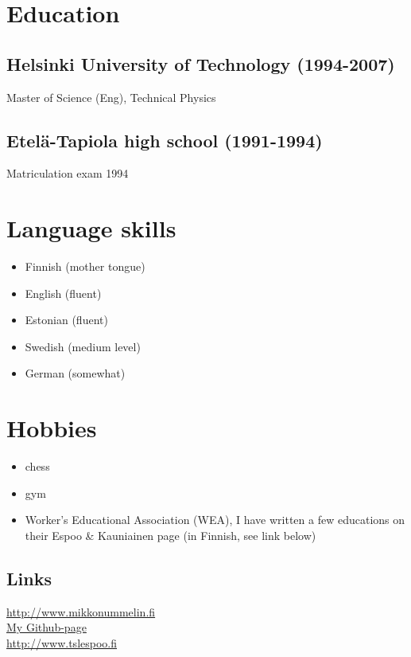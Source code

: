 \documentclass[a4paper,12pt]{article}
\begin{document}
\section*{Education}
\subsection*{Helsinki University of Technology (1994-2007)}
Master of Science (Eng), Technical Physics
\subsection*{Etelä-Tapiola high school (1991-1994)}
Matriculation exam 1994
\section*{Language skills}
\begin{itemize}
\item{Finnish (mother tongue)}
\item{English (fluent)}
\item{Estonian (fluent)}
\item{Swedish (medium level)}
\item{German (somewhat)}
\end{itemize}
\section*{Hobbies}
\begin{itemize}
\item{chess}
\item{gym}
\item{Worker's Educational Association (WEA), I have written a few educations on their Espoo \& Kauniainen page (in Finnish, see link below)}
\end{itemize}
\subsection*{Links}
\href{http://www.mikkonummelin.fi}{http://www.mikkonummelin.fi} \\
\href{http://github.com/mnummeli}{My Github-page} \\
\href{http://www.tslespoo.fi}{http://www.tslespoo.fi}
\end{document}

